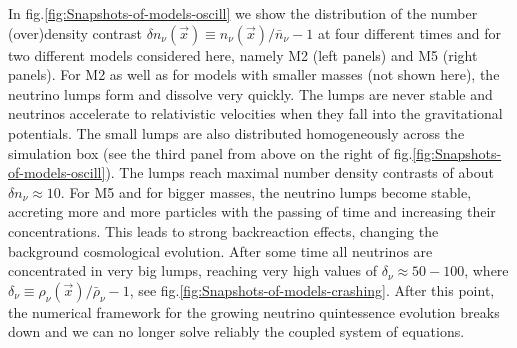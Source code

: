 In fig.\ref{fig:Snapshots-of-models-oscill} we show the distribution
of the number (over)density contrast $\delta n_{\nu}(\vec{x})\equiv n_{\nu}(\vec{x})/\bar{n}_{\nu}-1$
at four different times and for two different models considered here,
namely M2 (left panels) and M5 (right panels). For M2 as well as for
models with smaller masses (not shown here), the neutrino lumps form
and dissolve very quickly. The lumps are never stable and neutrinos
accelerate to relativistic velocities when they fall into the gravitational
potentials. The small lumps are also distributed homogeneously across
the simulation box (see the third panel from above on the right of
fig.\ref{fig:Snapshots-of-models-oscill}). The lumps reach maximal
number density contrasts of about $\delta n_{\nu}\approx10$. For
M5 and for bigger masses, the neutrino lumps become stable, accreting
more and more particles with the passing of time and increasing their
concentrations. This leads to strong backreaction effects, changing
the background cosmological evolution. After some time all neutrinos
are concentrated in very big lumps, reaching very high values of $\delta{}_{\nu}\approx50-100$,
where $\delta_{\nu}\equiv\rho_{\nu}(\vec{x})/\bar{\rho}_{\nu}-1$,
see fig.\ref{fig:Snapshots-of-models-crashing}. After this point,
the numerical framework for the growing neutrino quintessence evolution
breaks down and we can no longer solve reliably the coupled system
of equations.

